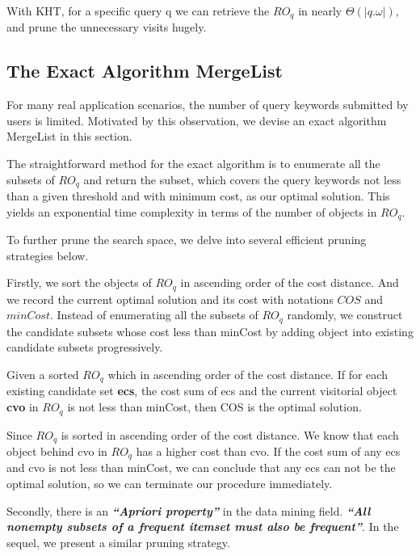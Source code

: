 With KHT, for a specific query q we can retrieve the $RO_q$ in nearly $\Theta(|q.\omega|)$, and prune the unnecessary visits hugely.

\subsection{The Exact Algorithm MergeList}
For many real application scenarios, the number of query keywords submitted by users is limited. Motivated by this observation, we devise an exact algorithm MergeList in this section.

The straightforward method for the exact algorithm is to enumerate all the subsets of $RO_q$ and return the subset, which covers the query keywords not less than a given threshold and with minimum cost, as our optimal solution. This yields an exponential time complexity in terms of the number of objects in $RO_q$.

To further prune the search space, we delve into several efficient pruning strategies below.

Firstly, we sort the objects of $RO_q$ in ascending order of the cost distance. And we record the current optimal solution and its cost with notations $COS$ and $minCost$. Instead of enumerating all the subsets of $RO_q$ randomly, we construct the candidate subsets whose cost less than minCost by adding object into existing candidate subsets progressively.

\begin{lem}
    Given a sorted $RO_q$ which in ascending order of the cost distance. If for each existing candidate set \textbf{ecs}, the cost sum of ecs and the current visitorial object \textbf{cvo} in $RO_q$ is not less than minCost, then COS is the optimal solution.
    \begin{pot}
        Since $RO_q$ is sorted in ascending order of the cost distance. We know that each object behind cvo in $RO_q$ has a higher cost than cvo. If the cost sum of any ecs and cvo is not less than minCost, we can conclude that any ecs can not be the optimal solution, so we can terminate our procedure immediately.
    \end{pot}
\end{lem} \label{L5}

Secondly, there is an \textbf{\textit{``Apriori property''}} in the data mining field. \textbf{\textit{``All nonempty subsets of a frequent itemset must also be frequent''}}. In the sequel, we present a similar pruning strategy.

